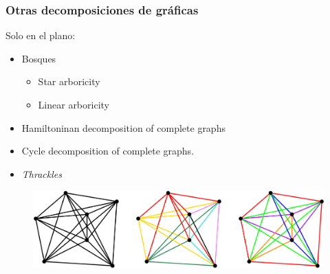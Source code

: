 \begin{frame}
	\frametitle{Otras decomposiciones de gráficas}
	Solo en el plano:
	\begin{itemize}
		\item Bosques
		\begin{itemize}
			\item Star arboricity
			\item Linear arboricity
		\end{itemize}
		\item Hamiltoninan decomposition of complete graphs
		\item Cycle decomposition of complete graphs.
		\item \emph{Thrackles}
	\end{itemize}
	\begin{figure}
		\centering
		\includegraphics[width=1\linewidth]{images/other_decompositions}
	\end{figure}
\end{frame}

